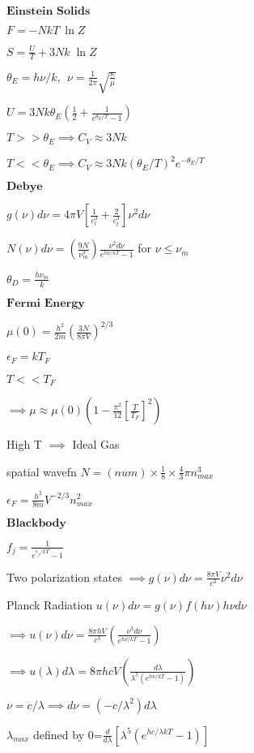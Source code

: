 \documentclass{article}
\begin{document}
\begin{multicols}{3}
$\textbf{Einstein Solids}$

$F= -NkT\:\ln Z$

$S=\frac{U}{T} + 3Nk \;\ln Z$

$\theta_E = h \nu / k, \:\:\nu = \frac{1}{2 \pi} \sqrt{\frac{\kappa}{\mu}}$

$U=3Nk\theta_E (\frac{1}{2}+\frac{1}{e^{\theta_E/T}-1})$

$T>>\theta_E \implies C_V \approx 3Nk$

$T<<\theta_E \implies C_V \approx 3Nk(\theta_E/T)^2 e^{-\theta_E/T}$

$\textbf{Debye}$

$g(\nu)d\nu=4\pi V\left[ \frac{1}{c_l^3} + \frac{2}{c_t^3} \right] \nu^2d\nu$

$N(\nu)d\nu=\left(\frac{9N}{\nu_m^3}\right)\frac{\nu^2d\nu}{e^{h\nu/kT}-1}$ for $\nu \leq \nu_m$

$\theta_D=\frac{h\nu_m}{k}$

$\textbf{Fermi Energy}$

$\mu(0)=\frac{h^2}{2m} \left( \frac{3N}{8\pi V} \right)^{2/3}$

$\epsilon_F=k T_F$

$T<<T_F$

$\implies \mu \approx \mu(0) \left ( 1-\frac{\pi^2}{12} \left[ \frac{T}{T_F} \right]^2 \right)$

High T $\implies$ Ideal Gas

spatial wavefn $N=(num)\times\frac{1}{8}\times\frac{4}{3}\pi n_{max}^3$

$\epsilon_F=\frac{h^2}{8m}V^{-2/3}n_{max}^2$

$\textbf{Blackbody}$

$f_j=\frac{1}{e^{\epsilon_j/kT}-1}$

Two polarization states $\implies g(\nu)d\nu=\frac{8\pi V}{c^3}\nu^2d\nu$

Planck Radiation $u(\nu)d\nu=g(\nu)f(h\nu)h\nu d\nu$

$\implies u(\nu)d\nu=\frac{8\pi h V}{c^3} \left ( \frac{\nu^3 d\nu}{e^{h\nu /kT}-1} \right )$

$\implies u(\lambda)d\lambda=8\pi hcV \left ( \frac{d\lambda}{\lambda^5 (e^{h\nu /kT}-1)} \right )$

$\nu=c/\lambda \implies d\nu=(-c/\lambda^2)d\lambda$

$\lambda_{max}$ defined by 0=$\frac{d}{d\lambda}[\lambda^5(e^{hc/\lambda kT}-1)]$


\end{multicols}
\end{document}
